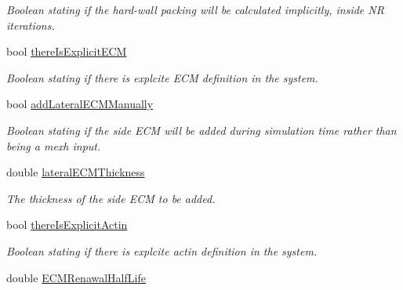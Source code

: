 \begin{DoxyCompactItemize}
\begin{DoxyCompactList}\small\item\em Boolean stating if the hard-\/wall packing will be calculated implicitly, inside N\+R iterations. \end{DoxyCompactList}\item 
\hypertarget{classSimulation_a2f2da7191c739e175284886243762a90}{}bool \hyperlink{classSimulation_a2f2da7191c739e175284886243762a90}{there\+Is\+Explicit\+E\+C\+M}\label{classSimulation_a2f2da7191c739e175284886243762a90}

\begin{DoxyCompactList}\small\item\em Boolean stating if there is explcite E\+C\+M definition in the system. \end{DoxyCompactList}\item 
\hypertarget{classSimulation_a3c21241b429a8670ecf91d898ccfcf8b}{}bool \hyperlink{classSimulation_a3c21241b429a8670ecf91d898ccfcf8b}{add\+Lateral\+E\+C\+M\+Manually}\label{classSimulation_a3c21241b429a8670ecf91d898ccfcf8b}

\begin{DoxyCompactList}\small\item\em Boolean stating if the side E\+C\+M will be added during simulation time rather than being a mexh input. \end{DoxyCompactList}\item 
\hypertarget{classSimulation_af80f316c1518d8dbfaca351f3f4066ca}{}double \hyperlink{classSimulation_af80f316c1518d8dbfaca351f3f4066ca}{lateral\+E\+C\+M\+Thickness}\label{classSimulation_af80f316c1518d8dbfaca351f3f4066ca}

\begin{DoxyCompactList}\small\item\em The thickness of the side E\+C\+M to be added. \end{DoxyCompactList}\item 
\hypertarget{classSimulation_ab090ea461851d09d2ad06bce76967433}{}bool \hyperlink{classSimulation_ab090ea461851d09d2ad06bce76967433}{there\+Is\+Explicit\+Actin}\label{classSimulation_ab090ea461851d09d2ad06bce76967433}

\begin{DoxyCompactList}\small\item\em Boolean stating if there is explcite actin definition in the system. \end{DoxyCompactList}\item 
\hypertarget{classSimulation_a30bc298189ac3e82173c728e32e4a384}{}double \hyperlink{classSimulation_a30bc298189ac3e82173c728e32e4a384}{E\+C\+M\+Renawal\+Half\+Life}\label{classSimulation_a30bc298189ac3e82173c728e32e4a384}


\end{DoxyCompactItemize}
